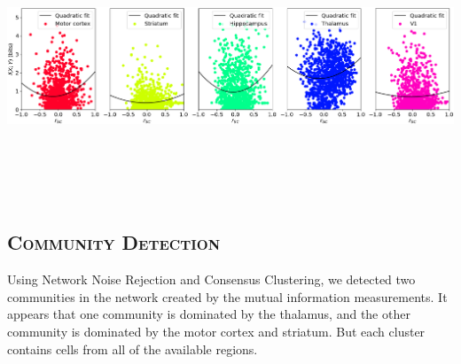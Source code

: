 \documentclass[a0,portrait]{a0poster}
\begin{document}
\begin{multicols}{2}
\includegraphics[width=\linewidth, height=8cm]{info_vs_corr.png}

\subsection*{\color{NavyBlue}\textsc{Community Detection}\color{Black}}

Using Network Noise Rejection and Consensus Clustering, we detected two communities in the network created by the mutual information measurements. It appears that one community is dominated by the thalamus, and the other community is dominated by the motor cortex and striatum. But each cluster contains cells from all of the available regions.


\end{multicols}
\end{document}
